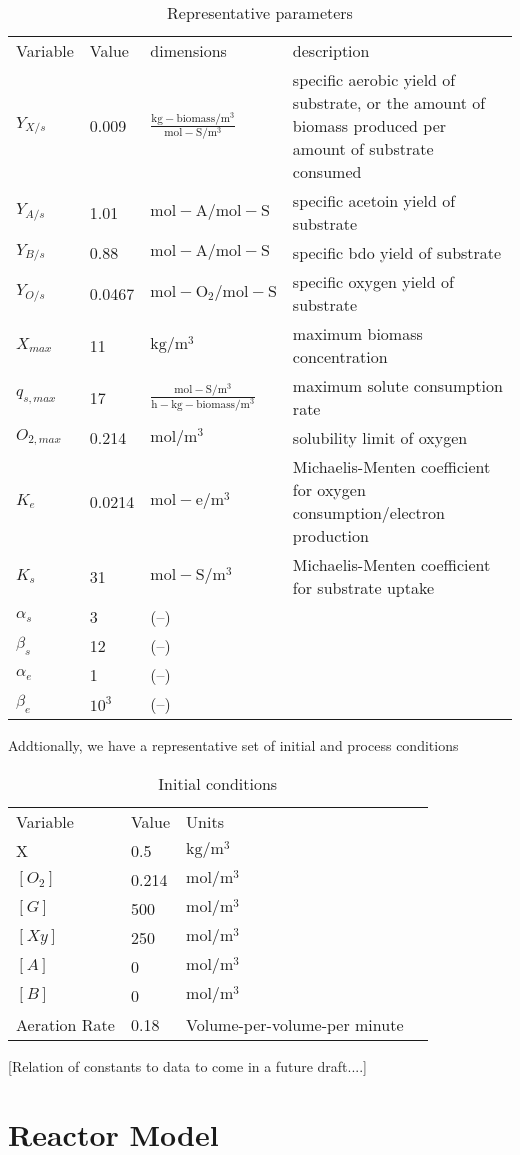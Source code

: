 \documentclass[11pt]{article} %
\begin{document}
\begin{table}[h!]
\caption{Representative parameters}
\begin{tabular}{l l l l } 
	Variable & Value & dimensions & description \\
	$Y_{X/s}$ & 0.009 & $\mathrm{\frac{kg-biomass/m^3}{mol-S/m^3}}$ & specific aerobic yield of substrate, or the amount of biomass produced per amount of substrate consumed \\
	$Y_{A/s}$ & 1.01 & $\mathrm{mol-A/mol-S}$ & specific acetoin yield of substrate \\
	$Y_{B/s}$ & 0.88  & $\mathrm{mol-A/mol-S}$ & specific bdo yield of substrate \\
	$Y_{O/s}$ & 0.0467 & $\mathrm{mol-O_2/mol-S}$ & specific oxygen yield of substrate \\
	$X_{max}$ & 11 & $\mathrm{kg/m^3}$ & maximum biomass concentration \\
	$q_{s, max}$ & 17 & $\mathrm{\frac{mol-S/m^3}{h-kg-biomass/m^3}}$ & maximum solute consumption rate \\
	$O_{2,max}$ & 0.214 & $\mathrm{mol/m^3}$ & solubility limit of oxygen \\
	$K_e$ & 0.0214 & $\mathrm{mol-e/m^3}$ & Michaelis-Menten coefficient for oxygen consumption/electron production \\
	$K_s$ & 31 & $\mathrm{mol-S/m^3}$ & Michaelis-Menten coefficient for substrate uptake\\
	$\alpha_s$ & 3 & (--) & \\
	$\beta_s$ & 12 & (--) & \\
	$\alpha_e$ & 1 & (--) & \\
	$\beta_e$ & $10^3$ & (--) &
	
\end{tabular}
\end{table}

Addtionally, we have a representative set of initial and process conditions

\begin{table}[h!]
\caption{Initial conditions}
\begin{tabular}{l l l l }
	Variable & Value & Units \\
	X & 0.5 & $\mathrm{kg/m^3}$ \\
	$[O_2]$ & 0.214 & $\mathrm{mol/m^3}$ \\
	$[G]$ & 500 & $\mathrm{mol/m^3}$ \\
	$[Xy]$ & 250 & $\mathrm{mol/m^3}$ \\
	$[A]$ & 0 & $\mathrm{mol/m^3}$ \\
	$[B]$ & 0 & $\mathrm{mol/m^3}$ \\
	Aeration Rate & 0.18 & Volume-per-volume-per minute
\end{tabular}
\end{table}
	


[Relation of constants to data to come in a future draft....]

\section{Reactor Model}
\end{document}
